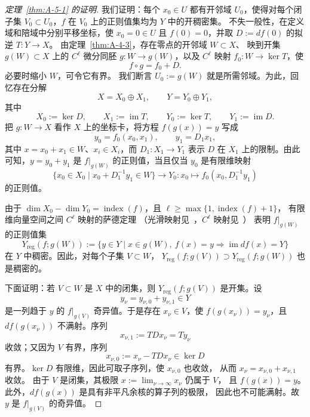 \begin{proof}[定理~\ref{thm:A-5-1} 的证明]
我们证明：每个 $x_0\in U$ 都有开邻域 $U_0$，使得对每个闭子集
$V_0\subset U_0$，$f$ 在 $V_0$ 上的正则值集均为 $Y$ 中的开稠密集。
不失一般性，在定义域和陪域中分别平移坐标，使 $x_0=0\in U$ 且
$f(0)=0$，并取 $D:=df(0)$ 的拟逆 $T:Y\to X$。
由定理~\ref{thm:A-4-3}，存在零点的开邻域 $W\subset X$、
映到开集 $g(W)\subset X$ 上的 $C^\ell$ 微分同胚
$g:W\to g(W)$，以及 $C^\ell$ 映射 $f_0:W\to\ker T$，使
\[
  f\circ g=f_0+D.
\]
必要时缩小 $W$，可令它有界。
我们断言 $U_0:=g(W)$ 就是所需邻域。为此，回忆存在分解
\[
  X=X_0\oplus X_1,\qquad Y=Y_0\oplus Y_1,
\]
其中
\[
  X_0:=\ker D,\qquad X_1:=\operatorname{im}T,\qquad
  Y_0:=\ker T,\qquad Y_1:=\operatorname{im}D.
\]
把 $g:W\to X$ 看作 $X$ 上的坐标卡，将方程 $f(g(x))=y$ 写成
\[
  y_0=f_0(x_0,x_1),\qquad y_1=D_1x_1,
\]
其中 $x=x_0+x_1\in W$、$x_i\in X_i$，而 $D_1:X_1\to Y_1$
表示 $D$ 在 $X_1$ 上的限制。由此可知，$y=y_0+y_1$ 是
$f|_{g(W)}$ 的正则值，当且仅当 $y_0$ 是有限维映射
\[
  \bigl\{x_0\in X_0\mid x_0+D_1^{-1}y_1\in W\bigr\}
  \longrightarrow Y_0:
  x_0\longmapsto f_0(x_0,D_1^{-1}y_1)
\]
的正则值。

由于 $\dim X_0-\dim Y_0=\operatorname{index}(f)$，且
$\ell\ge\max\{1,\operatorname{index}(f)+1\}$，
有限维向量空间之间 $C^\ell$ 映射的萨德定理
（光滑映射见~，$C^\ell$ 映射见~）
表明 $f|_{g(W)}$ 的正则值集
\[
  Y_{\mathrm{reg}}(f;g(W)):=
  \bigl\{y\in Y\mid x\in g(W),\ f(x)=y
  \Longrightarrow\operatorname{im}df(x)=Y\bigr\}
\]
在 $Y$ 中稠密。因此，对每个子集 $V\subset W$，
$Y_{\mathrm{reg}}(f;g(V))\supset Y_{\mathrm{reg}}(f;g(W))$ 也是稠密的。

下面证明：若 $V\subset W$ 是 $X$ 中的闭集，则
$Y_{\mathrm{reg}}(f;g(V))$ 是开集。设
\[
  y_\nu=y_{\nu,0}+y_{\nu,1}\in Y
\]
是一列趋于 $y$ 的 $f|_{g(V)}$ 奇异值。于是存在 $x_\nu\in V$，使
$f(g(x_\nu))=y_\nu$，且 $df(g(x_\nu))$ 不满射。序列
\[
  x_{\nu,1}:=TDx_\nu=Ty_\nu
\]
收敛；又因为 $V$ 有界，序列
\[
  x_{\nu,0}:=x_\nu-TDx_\nu\in\ker D
\]
有界。$\ker D$ 有限维，因此可取子序列，使 $x_{\nu,0}$ 也收敛，
从而 $x_\nu=x_{\nu,0}+x_{\nu,1}$ 收敛。
由于 $V$ 是闭集，其极限 $x:=\lim_{\nu\to\infty}x_\nu$ 仍属于 $V$，
且 $f(g(x))=y$。此外，$df(g(x))$ 是具有非平凡余核的算子列的极限，
因此也不可能满射。故 $y$ 是 $f|_{g(V)}$ 的奇异值。


\end{proof}
